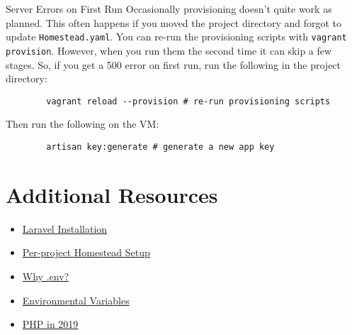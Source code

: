 \begin{infobox}{Server Errors on First Run}
    Occasionally provisioning doesn't quite work as planned. This often happens if you moved the project directory and forgot to update \texttt{Homestead.yaml}. You can re-run the provisioning scripts with \texttt{vagrant provision}. However, when you run them the second time it can skip a few stages. So, if you get a 500 error on first run, run the following in the project directory:

    \begin{verbatim}
        vagrant reload --provision # re-run provisioning scripts
    \end{verbatim}

    Then run the following on the VM:

    \begin{verbatim}
        artisan key:generate # generate a new app key
    \end{verbatim}
\end{infobox}


\section{Additional Resources}

\begin{itemize}[leftmargin=*]
    \item \href{https://laravel.com/docs/master/installation#installation}{Laravel Installation}
    \item \href{http://laravel.com/docs/master/homestead#per-project-installation}{Per-project Homestead Setup}
    \item \href{https://github.com/vlucas/phpdotenv#why-env}{Why .env?}
    \item \href{https://en.wikipedia.org/wiki/Environment\_variable}{Environmental Variables}
    \item \href{https://stitcher.io/blog/php-in-2019}{PHP in 2019}
\end{itemize}
